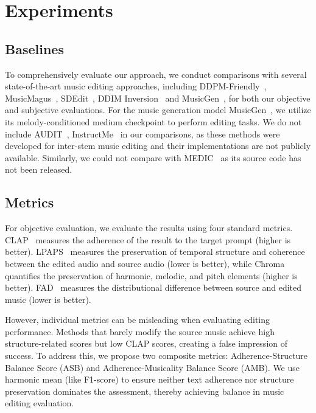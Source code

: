 \section{Experiments}

\subsection{Baselines}
\label{sec:base}
To comprehensively evaluate our approach, we conduct comparisons with several state-of-the-art music editing approaches, including DDPM-Friendly~\cite{manor2024ddpm}, MusicMagus~\cite{magus}, SDEdit~\cite{meng2021sdedit}, DDIM Inversion~\cite{song2020ddim} and MusicGen~\cite{musicgen}, for both our objective and subjective evaluations. For the music generation model MusicGen~\cite{musicgen}, we utilize its melody-conditioned medium checkpoint to perform editing tasks. We do not include AUDIT~\cite{wang2023audit}, InstructMe~\cite{han2023instructme} in our comparisons, as these methods were developed for inter-stem music editing and their implementations are not publicly available. Similarly, we could not compare with MEDIC~\cite{liu2024medic} as its source code has not been released.

\subsection{Metrics}
\label{sec:metirc}
For objective evaluation, we evaluate the results using four standard metrics. CLAP~\cite{wu2023largeclap} measures the adherence of the result to the target prompt (higher is better). LPAPS~\cite{paissan2023audiolpaps} measures the preservation of temporal structure and coherence between the edited audio and source audio (lower is better), while Chroma~\cite{musicgen} quantifies the preservation of harmonic, melodic, and pitch elements (higher is better). FAD~\cite{kilgour2018fad} measures the distributional
difference between source and edited music (lower is better). 

However, individual metrics can be misleading when evaluating editing performance. Methods that barely modify the source music achieve high structure-related scores but low CLAP scores, creating a false impression of success. To address this, we propose two composite metrics: Adherence-Structure Balance Score (ASB) and Adherence-Musicality Balance Score (AMB). We use harmonic mean (like F1-score) to ensure neither text adherence nor structure preservation dominates the assessment, thereby achieving balance in music editing evaluation.

